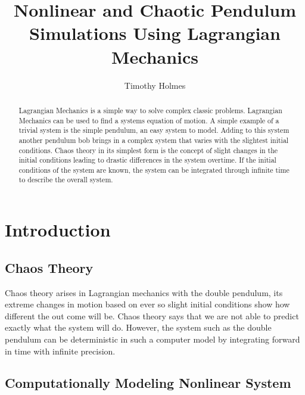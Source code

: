 \documentclass[runningheads]{llncs}
\begin{document}
\title{Nonlinear and Chaotic Pendulum Simulations Using Lagrangian Mechanics}
%
\author{Timothy Holmes}
%
%
%
\maketitle              %
%
\begin{abstract}
Lagrangian Mechanics is a simple way to solve complex classic problems. Lagrangian Mechanics can be used to find a systems equation of motion. A simple example of a trivial system is the simple pendulum, an easy system to model. Adding to this system another pendulum bob brings in a complex system that varies with the slightest initial conditions. Chaos theory in its simplest form is the concept of slight changes in the initial conditions leading to drastic differences in the system overtime. If the initial conditions of the system are known, the system can be integrated through infinite time to describe the overall system.
%
\end{abstract}
%
%
%
\section{Introduction}
\subsection{Chaos Theory}

Chaos theory arises in Lagrangian mechanics with the double pendulum, its extreme changes in motion based on ever so slight initial conditions show how different the out come will be. Chaos theory says that we are not able to predict exactly what the system will do. However, the system such as the double pendulum can be deterministic in such a computer model by integrating forward in time with infinite precision.  

\subsection{Computationally Modeling Nonlinear System}
\end{document}
